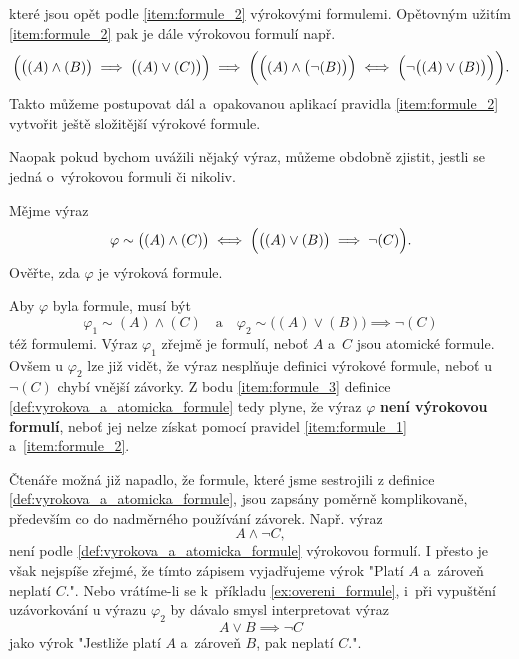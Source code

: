 které jsou opět podle \ref{item:formule_2} výrokovými formulemi. Opětovným užitím \ref{item:formule_2} pak je dále výrokovou formulí např.
\begin{equation*}
    \Bigl(\bigl((A) \land (B)\bigr) \implies \bigl((A) \lor (C)\bigr)\Bigr) \implies \bigg(\Bigl((A) \land \bigl(\neg(B)\bigr)\Bigr) \iff \Bigl(\neg\bigl((A) \lor (B)\bigr)\Bigr)\bigg).
\end{equation*}
Takto můžeme postupovat dál a~opakovanou aplikací pravidla \ref{item:formule_2} vytvořit ještě složitější výrokové formule.\par
Naopak pokud bychom uvážili nějaký výraz, můžeme obdobně zjistit, jestli se jedná o~výrokovou formuli či nikoliv.
\begin{example}\label{ex:overeni_formule}
    Mějme výraz
    \begin{equation*}
        \varphi\sim\bigl((A) \land (C)\bigr) \iff \Bigl(\bigl((A) \lor (B)\bigr) \implies \neg(C)\Bigr).
    \end{equation*}
    Ověřte, zda $\varphi$ je výroková formule.\par
    \begin{solution}
        Aby $\varphi$ byla formule, musí být
        \begin{equation*}
            \varphi_1\sim(A) \land (C)\quad\text{a}\quad\varphi_2\sim\bigl((A) \lor (B)\bigr) \implies \neg(C)
        \end{equation*}
        též formulemi. Výraz $\varphi_1$ zřejmě je formulí, neboť $A$ a~$C$ jsou atomické formule. Ovšem u $\varphi_2$ lze již vidět, že výraz nesplňuje definici výrokové formule, neboť u $\neg(C)$ chybí vnější závorky. Z bodu \ref{item:formule_3} definice \ref{def:vyrokova_a_atomicka_formule} tedy plyne, že výraz $\varphi$ \textbf{není výrokovou formulí}, neboť jej nelze získat pomocí pravidel \ref{item:formule_1} a~\ref{item:formule_2}.
    \end{solution}
\end{example}

Čtenáře možná již napadlo, že formule, které jsme sestrojili z definice \ref{def:vyrokova_a_atomicka_formule}, jsou zapsány poměrně komplikovaně, především co do nadměrného používání závorek. Např. výraz
\begin{equation}\label{eq:poradi_operaci}
    A \land \neg C,
\end{equation}
není podle \ref{def:vyrokova_a_atomicka_formule} výrokovou formulí. I přesto je však nejspíše zřejmé, že tímto zápisem vyjadřujeme výrok "Platí $A$ a~zároveň neplatí $C$.". Nebo vrátíme-li se k~příkladu \ref{ex:overeni_formule}, i~při vypuštění uzávorkování u výrazu $\varphi_2$ by dávalo smysl interpretovat výraz
\begin{equation*}\label{eq:vypusteni_uzavorkovani}
    A \lor B \implies \neg C
\end{equation*}
jako výrok "Jestliže platí $A$ a~zároveň $B$, pak neplatí $C$.".